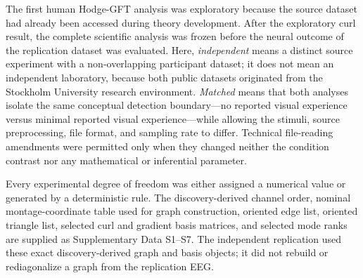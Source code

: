 \documentclass[12pt]{article}
\begin{document}
The first human Hodge-GFT analysis was exploratory because the source dataset had already been accessed during theory development. After the exploratory curl result, the complete scientific analysis was frozen before the neural outcome of the replication dataset was evaluated. Here, \emph{independent} means a distinct source experiment with a non-overlapping participant dataset; it does not mean an independent laboratory, because both public datasets originated from the Stockholm University research environment. \emph{Matched} means that both analyses isolate the same conceptual detection boundary---no reported visual experience versus minimal reported visual experience---while allowing the stimuli, source preprocessing, file format, and sampling rate to differ. Technical file-reading amendments were permitted only when they changed neither the condition contrast nor any mathematical or inferential parameter.

Every experimental degree of freedom was either assigned a numerical value or generated by a deterministic rule. The discovery-derived channel order, nominal montage-coordinate table used for graph construction, oriented edge list, oriented triangle list, selected curl and gradient basis matrices, and selected mode ranks are supplied as Supplementary Data S1--S7. The independent replication used these exact discovery-derived graph and basis objects; it did not rebuild or rediagonalize a graph from the replication EEG.
\end{document}
